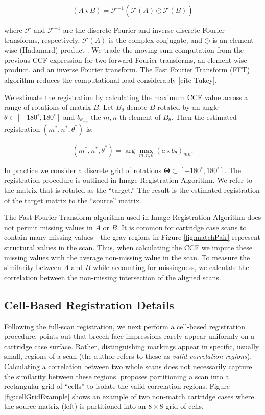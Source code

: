 \documentclass[11pt,]{isuthesis}
\begin{document}
\[
(A \star B) = \mathcal{F}^{-1}\left(\overline{\mathcal{F}(A)} \odot \mathcal{F}(B)\right)
\]

where \(\mathcal{F}\) and \(\mathcal{F}^{-1}\) are the discrete Fourier and inverse discrete Fourier transforms, respectively, \(\overline{\mathcal{F}(A)}\) is the complex conjugate, and \(\odot\) is an element-wise (Hadamard) product \citep{fft_brigham}.
We trade the moving sum computation from the previous CCF expression for two forward Fourier transforms, an element-wise product, and an inverse Fourier transform.
The Fast Fourier Transform (FFT) algorithm reduces the computational load considerably {[}cite Tukey{]}.

We estimate the registration by calculating the maximum CCF value across a range of rotations of matrix \(B\).
Let \(B_\theta\) denote \(B\) rotated by an angle \(\theta \in [-180^\circ,180^\circ]\) and \(b_{\theta_{mn}}\) the \(m,n\)-th element of \(B_\theta\).
Then the estimated registration \((m^*,n^*,\theta^*)\) is:

\[
(m^*,n^*,\theta^*) = \arg \max_{m,n,\theta} (a \star b_\theta)_{mn}.
\]

In practice we consider a discrete grid of rotations \(\pmb{\Theta} \subset [-180^\circ,180^\circ]\).
The registration procedure is outlined in Image Registration Algorithm.
We refer to the matrix that is rotated as the ``target.''
The result is the estimated registration of the target matrix to the ``source'' matrix.

The Fast Fourier Transform algorithm used in Image Registration Algorithm does not permit missing values in \(A\) or \(B\).
It is common for cartridge case scans to contain many missing values - the gray regions in Figure \ref{fig:matchPair} represent structural values in the scan.
Thus, when calculating the CCF we impute these missing values with the average non-missing value in the scan.
To measure the similarity between \(A\) and \(B\) while accounting for missingness, we calculate the correlation between the non-missing intersection of the aligned scans.

\hypertarget{cell-based-registration-details}{%
\subsection{Cell-Based Registration Details}\label{cell-based-registration-details}}

Following the full-scan registration, we next perform a cell-based registration procedure.
\citet{song_proposed_2013} points out that breech face impressions rarely appear uniformly on a cartridge case surface.
Rather, distinguishing markings appear in specific, usually small, regions of a scan (the author refers to these as \emph{valid correlation regions}).
Calculating a correlation between two whole scans does not necessarily capture the similarity between these regions.
\citet{song_proposed_2013} proposes partitioning a scan into a rectangular grid of ``cells'' to isolate the valid correlation regions.
Figure \ref{fig:cellGridExample} shows an example of two non-match cartridge cases where the source matrix (left) is partitioned into an \(8 \times 8\) grid of cells.
\end{document}
